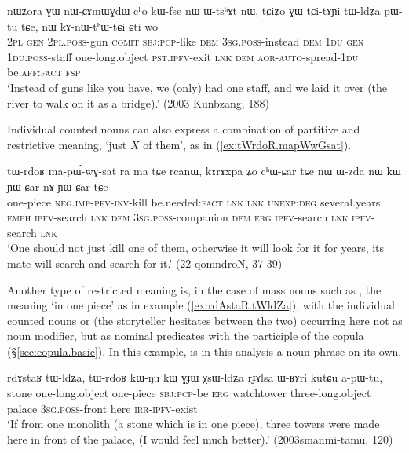 \begin{exe}
	\ex \label{ex:tAYi.tWldZa}
	\gll nɯʑora ɣɯ nɯ-ɕɤmɯɣdɯ cʰo kɯ-fse nɯ ɯ-tsʰɤt nɯ, tɕiʑo ɣɯ tɕi-tɤɲi tɯ-ldʑa pɯ-tu tɕe, nɯ kɤ-nɯ-tʰɯ-tɕi ɕti wo \\
	\textsc{2pl} \textsc{gen} \textsc{2pl}.\textsc{poss}-gun \textsc{comit} \textsc{sbj}:\textsc{pcp}-like \textsc{dem} \textsc{3sg}.\textsc{poss}-instead \textsc{dem}  \textsc{1du} \textsc{gen} \textsc{1du}.\textsc{poss}-staff one-long.object \textsc{pst}.\textsc{ipfv}-exit \textsc{lnk} \textsc{dem} \textsc{aor}-\textsc{auto}-spread-\textsc{1du} be.\textsc{aff}:\textsc{fact} \textsc{fsp} \\
	\glt `Instead of guns like you have, we (only) had one staff, and we laid it over (the river to walk on it as a bridge).' (2003 Kunbzang, 188)
\end{exe} 

Individual counted nouns can also express a combination of partitive and restrictive meaning, `just $X$ of them', as in (\ref{ex:tWrdoR.mapWwGsat}).

\begin{exe}
	\ex \label{ex:tWrdoR.mapWwGsat}
	\gll 
	tɯ-rdoʁ ma-pɯ́-wɣ-sat ra ma tɕe rcanɯ, kɤrɤxpa ʑo cʰɯ-ɕar tɕe nɯ ɯ-zda nɯ kɯ ɲɯ-ɕar nɤ ɲɯ-ɕar tɕe \\
	one-piece \textsc{neg}.\textsc{imp}-\textsc{pfv}-\textsc{inv}-kill be.needed:\textsc{fact} \textsc{lnk} \textsc{lnk} \textsc{unexp}:\textsc{deg} several.years \textsc{emph} \textsc{ipfv}-search \textsc{lnk} \textsc{dem} \textsc{3sg}.\textsc{poss}-companion \textsc{dem} \textsc{erg} \textsc{ipfv}-search \textsc{lnk} \textsc{ipfv}-search \textsc{lnk} \\
	\glt `One should not just kill one of them, otherwise it will look for it for years, its mate will search and search for it.' (22-qomndroN, 37-39)
\end{exe}

Another type of restricted meaning is, in the case of mass nouns such as , the meaning `in one piece' as in example (\ref{ex:rdAstaR.tWldZa}), with the individual counted nouns  or  (the storyteller hesitates between the two) occurring here not as noun modifier, but as nominal predicates with the participle of the copula  (§\ref{sec:copula.basic}). In this example,  is in this analysis a noun phrase on its own.

\begin{exe}
	\ex \label{ex:rdAstaR.tWldZa}
	\gll rdɤstaʁ tɯ-ldʑa, tɯ-rdoʁ kɯ-ŋu kɯ ɣɟɯ χsɯ-ldʑa rɟɤlsa ɯ-ʁɤri kutɕu a-pɯ-tu, \\
	stone one-long.object one-piece \textsc{sbj}:\textsc{pcp}-be \textsc{erg} watchtower three-long.object palace \textsc{3sg}.\textsc{poss}-front here \textsc{irr}-\textsc{ipfv}-exist \\
	\glt `If from one monolith (a stone which is in one piece), three  towers were made here in front of the palace, (I would feel much better).'  (2003smanmi-tamu, 120)
\end{exe} 

